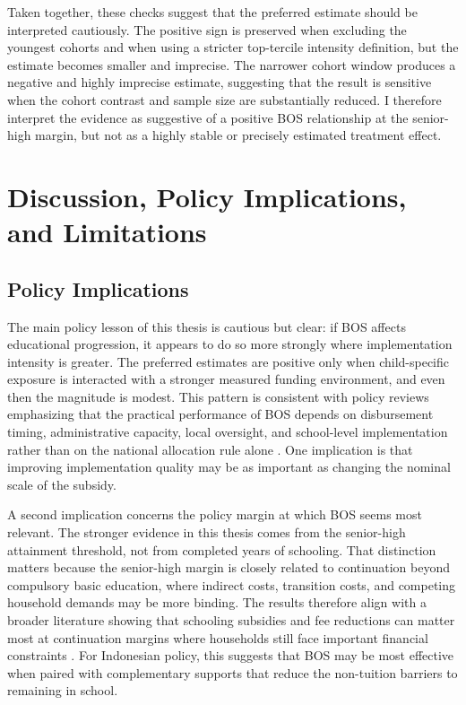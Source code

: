 \documentclass[a4paper, 12pt]{article}
\begin{document}
\begin{doublespacing}
Taken together, these checks suggest that the preferred estimate should be interpreted cautiously. The positive sign is preserved when excluding the youngest cohorts and when using a stricter top-tercile intensity definition, but the estimate becomes smaller and imprecise. The narrower cohort window produces a negative and highly imprecise estimate, suggesting that the result is sensitive when the cohort contrast and sample size are substantially reduced. I therefore interpret the evidence as suggestive of a positive BOS relationship at the senior-high margin, but not as a highly stable or precisely estimated treatment effect.

\section{Discussion, Policy Implications, and Limitations}
\subsection{Policy Implications}
The main policy lesson of this thesis is cautious but clear: if BOS affects educational progression, it appears to do so more strongly where implementation intensity is greater. The preferred estimates are positive only when child-specific exposure is interacted with a stronger measured funding environment, and even then the magnitude is modest. This pattern is consistent with policy reviews emphasizing that the practical performance of BOS depends on disbursement timing, administrative capacity, local oversight, and school-level implementation rather than on the national allocation rule alone \citep{WorldBank2008,WorldBank2014,SMERUUNESCO2024}. One implication is that improving implementation quality may be as important as changing the nominal scale of the subsidy.

A second implication concerns the policy margin at which BOS seems most relevant. The stronger evidence in this thesis comes from the senior-high attainment threshold, not from completed years of schooling. That distinction matters because the senior-high margin is closely related to continuation beyond compulsory basic education, where indirect costs, transition costs, and competing household demands may be more binding. The results therefore align with a broader literature showing that schooling subsidies and fee reductions can matter most at continuation margins where households still face important financial constraints \citep{GlewweMuralidharan2016,FilmerSchady2014,DufloDupasKremer2021}. For Indonesian policy, this suggests that BOS may be most effective when paired with complementary supports that reduce the non-tuition barriers to remaining in school.


\end{doublespacing}
\end{document}
